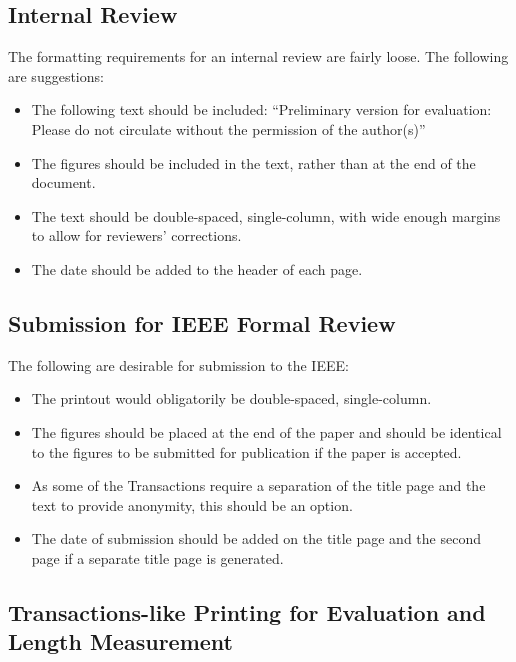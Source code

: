 \documentclass[%
	final,
	notitlepage,
	narroweqnarray,
	inline,
	twoside,
	]{ieee}
\begin{document}
\subsection{Internal Review}
The formatting requirements for an internal review are fairly loose.
The following are suggestions:
\begin{itemize}
\item The following text should be included:
      ``Preliminary version for evaluation: Please do not circulate 
      without the permission of the author(s)''
\item The figures should be included in the text, rather than at the
      end of the document. 
\item The text should be double-spaced, single-column, with wide enough 
      margins to allow for reviewers' corrections.
\item The date should be added to the header of each page. 
\end{itemize}

\subsection{Submission for IEEE Formal Review}
\label{sec:review}

The following are desirable for submission to the IEEE:
\begin{itemize}
\item The printout would obligatorily be double-spaced, single-column.  
\item The figures should be placed at the end of the paper and should
      be identical to the figures to be submitted for publication if
      the paper is accepted.
\item As some of the Transactions require a separation of the title
      page and the text to provide anonymity, this should be an
      option. 
\item The date of submission should be added on the title page 
      and the second page if a separate title page is generated.
\end{itemize}

\subsection{Transactions-like Printing for Evaluation and Length
Measurement}
\end{document}
